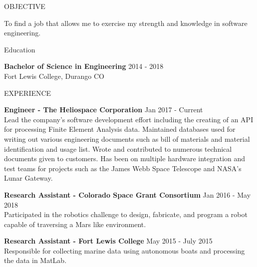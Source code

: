\documentclass{resume} %
\begin{document}

\begin{rSection}{OBJECTIVE}

{To find a job that allows me to exercise my strength and knowledge in software engineering.}

\end{rSection}

\begin{rSection}{Education}

{\bf Bachelor of Science in Engineering} \hfill {2014 - 2018}
\\ 
Fort Lewis College, Durango CO

\end{rSection}


\begin{rSection}{EXPERIENCE}

{\textbf{Engineer - The Heliospace Corporation} \hfill Jan 2017 - Current \\
Lead the company's software development effort including the creating of an API for processing Finite Element Analysis data. Maintained databases used for writing out various engineering documents such as bill of materials and material identification and usage list. Wrote and contributed to numerous technical documents given to customers. Has been on multiple hardware integration and test teams for projects such as the James Webb Space Telescope and NASA's Lunar Gateway.}

{\textbf{Research Assistant - Colorado Space Grant Consortium} \hfill Jan 2016 - May 2018 \\
Participated in the robotics challenge to design, fabricate, and program a robot capable of traversing a Mars like environment. }

{\textbf{Research Assistant - Fort Lewis College} \hfill May 2015 - July 2015 \\
Responsible for collecting marine data using autonomous boats and processing the data in MatLab.}

\end{rSection} 
\end{document}

